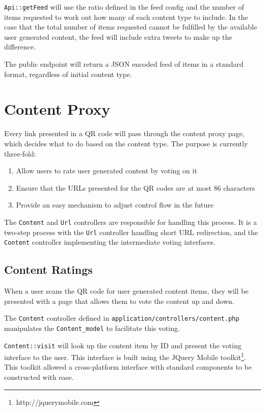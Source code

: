 \documentclass[11pt]{article}
\begin{document}
\texttt{Api::getFeed} will use the ratio defined in the feed config and the number of items requested to work out how many of each content type to include. In the case that the total number of items requested cannot be fulfilled by the available user generated content, the feed will include extra tweets to make up the difference.

The public endpoint will return a JSON encoded feed of items in a standard format, regardless of initial content type.

\section{Content Proxy}
Every link presented in a QR code will pass through the content proxy page, which decides what to do based on the content type. The purpose is currently three-fold:

\begin{enumerate}
	\item Allow users to rate user generated content by voting on it
	\item Ensure that the URLs presented for the QR codes are at most 86 characters
	\item Provide an easy mechanism to adjust control flow in the future
\end{enumerate}

The \texttt{Content} and \texttt{Url} controllers are responsible for handling this process. It is a two-step process with the \texttt{Url} controller handling short URL redirection, and the \texttt{Content} controller implementing the intermediate voting interfaces.

\subsection{Content Ratings}
When a user scans the QR code for user generated content items, they will be presented with a page that allows them to vote the content up and down.

The \texttt{Content} controller defined in \texttt{application/controllers/content.php} manipulates the \texttt{Content\_model} to facilitate this voting.

\texttt{Content::visit} will look up the content item by ID and present the voting interface to the user. This interface is built using the JQuery Mobile toolkit\footnote{http://jquerymobile.com}. This toolkit allowed a cross-platform interface with standard components to be constructed with ease.
\end{document}
